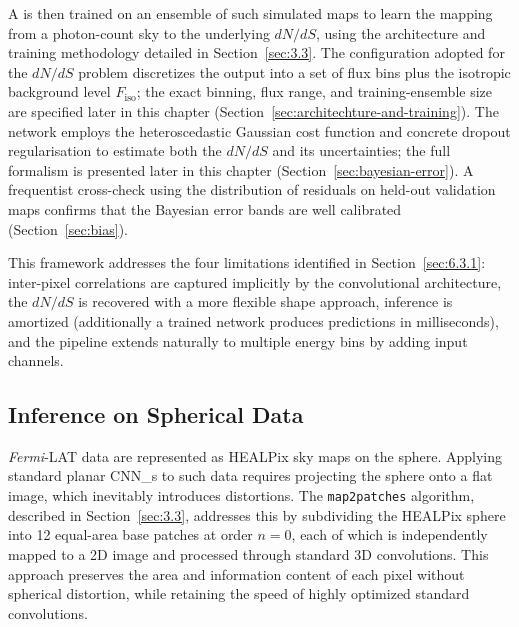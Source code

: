 A \CNN is then trained on an ensemble of such simulated maps to learn the mapping from a photon-count sky to the underlying $dN/dS$, using the architecture and training methodology detailed in Section~\ref{sec:3.3}.
The configuration adopted for the $dN/dS$ problem discretizes the output into a set of flux bins plus the isotropic background level $F_\mathrm{iso}$; the exact binning, flux range, and training-ensemble size are specified later in this chapter (Section~\ref{sec:architechture-and-training}).
The network employs the heteroscedastic Gaussian cost function and concrete dropout regularisation to estimate both the $dN/dS$ and its uncertainties; the full formalism is presented later in this chapter (Section~\ref{sec:bayesian-error}). A frequentist cross-check using the distribution of residuals on held-out validation maps confirms that the Bayesian error bands are well calibrated (Section~\ref{sec:bias}).

This framework addresses the four limitations identified in Section~\ref{sec:6.3.1}: inter-pixel \PSF correlations are captured implicitly by the convolutional architecture, the $dN/dS$ is recovered with a more flexible shape approach, inference is amortized (additionally a trained network produces predictions in milliseconds), and the pipeline extends naturally to multiple energy bins by adding input channels.

\subsection{Inference on Spherical Data}
\label{sec:6.3.3}

\textit{Fermi}-LAT data are represented as HEALPix sky maps on the sphere.
Applying standard planar \glspl{CNN_} to such data requires projecting the sphere onto a flat image, which inevitably introduces distortions.
The \texttt{map2patches} algorithm, described in Section~\ref{sec:3.3}, addresses this by subdividing the HEALPix sphere into 12 equal-area base patches at order $n=0$, each of which is independently mapped to a 2D image and processed through standard 3D convolutions.
This approach preserves the area and information content of each pixel without spherical distortion, while retaining the speed of highly optimized standard convolutions.

